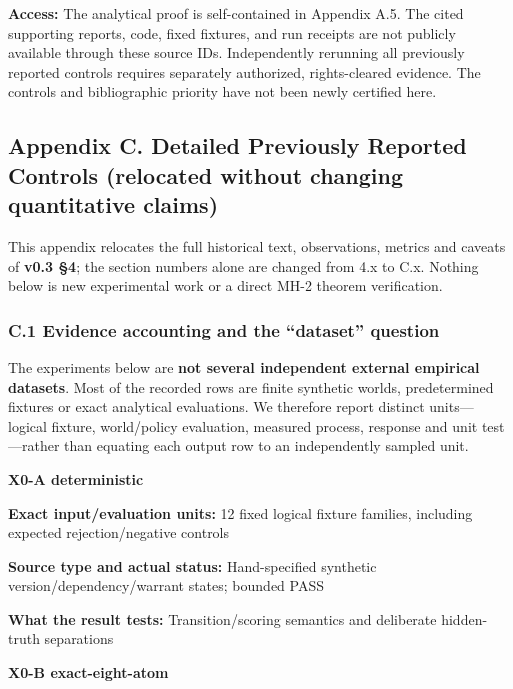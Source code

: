 \documentclass[
  10pt,
  american,
  a4paper,
]{article}
\begin{document}
\textbf{Access:} The analytical proof is self-contained in Appendix A.5.
The cited supporting reports, code, fixed fixtures, and run receipts are
not publicly available through these source IDs. Independently rerunning
all previously reported controls requires separately authorized,
rights-cleared evidence. The controls and bibliographic priority have
not been newly certified here.

\hypertarget{appendix-c.-detailed-previously-reported-controls-relocated-without-changing-quantitative-claims}{%
\subsection{Appendix C. Detailed Previously Reported Controls (relocated
without changing quantitative
claims)}\label{appendix-c.-detailed-previously-reported-controls-relocated-without-changing-quantitative-claims}}

This appendix relocates the full historical text, observations, metrics
and caveats of \textbf{v0.3 §4}; the section numbers alone are changed
from 4.x to C.x. Nothing below is new experimental work or a direct MH-2
theorem verification.

\hypertarget{c.1-evidence-accounting-and-the-dataset-question}{%
\subsubsection{C.1 Evidence accounting and the ``dataset''
question}\label{c.1-evidence-accounting-and-the-dataset-question}}

The experiments below are \textbf{not several independent external
empirical datasets}. Most of the recorded rows are finite synthetic
worlds, predetermined fixtures or exact analytical evaluations. We
therefore report distinct units---logical fixture, world/policy
evaluation, measured process, response and unit test---rather than
equating each output row to an independently sampled unit.

\textbf{X0-A deterministic}

\textbf{Exact input/evaluation units:} 12 fixed logical fixture
families, including expected rejection/negative controls

\textbf{Source type and actual status:} Hand-specified synthetic
version/dependency/warrant states; bounded PASS

\textbf{What the result tests:} Transition/scoring semantics and
deliberate hidden-truth separations

\textbf{X0-B exact-eight-atom}
\end{document}
